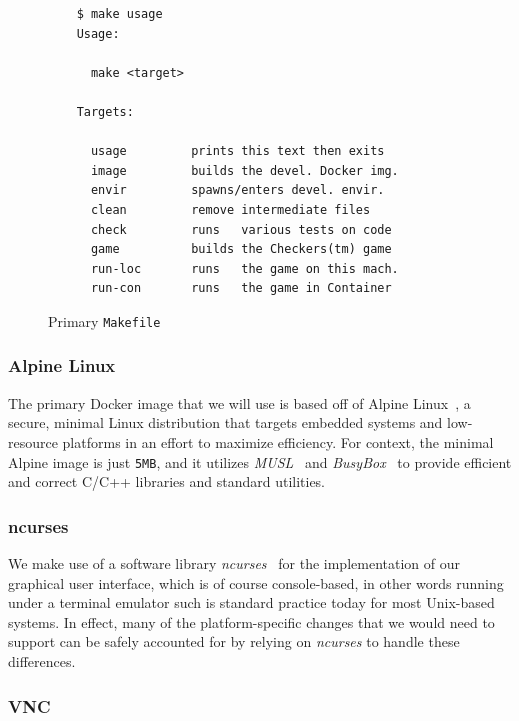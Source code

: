 \documentclass[letterpaper]{article}
\begin{document}
\lstset{basicstyle=\ttfamily}
\lstset{frame=tb}
\begin{figure}
    \begin{lstlisting}
    $ make usage
    Usage:

      make <target>

    Targets:

      usage         prints this text then exits
      image         builds the devel. Docker img.
      envir         spawns/enters devel. envir.
      clean         remove intermediate files
      check         runs   various tests on code
      game          builds the Checkers(tm) game
      run-loc       runs   the game on this mach.
      run-con       runs   the game in Container
    \end{lstlisting}
    \caption{Primary \texttt{Makefile}}
    \label{fig:overview_technologies_docker_makefile}
\end{figure}

\subsubsection{Alpine Linux}
\label{sec:overview_technologies_alpine}

The primary Docker image that we will use is based off of Alpine
Linux~\cite{alpine}, a secure, minimal Linux distribution that
targets embedded systems and low-resource platforms in an effort
to maximize efficiency. For context, the minimal Alpine image is
just \texttt{5MB}, and it utilizes \emph{MUSL}~\cite{musl} and
\emph{BusyBox}~\cite{busybox} to provide efficient and correct
C/C++ libraries and standard utilities.

\subsubsection{ncurses}
\label{sec:overview_technologies_ncurses}

We make use of a software library \emph{ncurses}~\cite{ncurses}
for the implementation of our graphical user interface, which is
of course console-based, in other words running under a terminal
emulator such is standard practice today for most Unix-based
systems. In effect, many of the platform-specific changes that
we would need to support can be safely accounted for by relying
on \emph{ncurses} to handle these differences.

\subsubsection{VNC}
\label{sec:overview_technologies_vnc}
\end{document}
